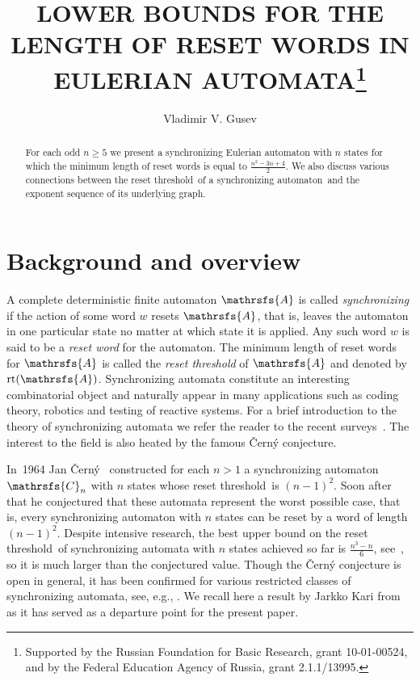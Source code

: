 \documentclass[12pt,twoside]{article}
\newcommand{\san}{synchronizing automaton}
\newcommand{\reth}{reset threshold}
\DeclareMathOperator{\rt}{rt}
\begin{document}
\title{LOWER BOUNDS FOR THE LENGTH OF RESET WORDS IN EULERIAN AUTOMATA\thanks{Supported
by the Russian Foundation for Basic Research, grant 10-01-00524, and by the
Federal Education Agency of Russia, grant 2.1.1/13995.}}
\author{Vladimir V. Gusev}

\maketitle

\begin{abstract}
For each odd $n\ge 5$ we present a synchronizing Eulerian automaton with $n$
states for which the minimum length of reset words is equal to $\frac{n^2 - 3n
+ 4}{2}$. We also discuss various connections between the \reth\ of a \san\ and
the exponent sequence of its underlying graph.
\end{abstract}

\thispagestyle{empty}

\section{Background and overview}
\label{intro}


A complete deterministic finite automaton $\mathrsfs{A}$ is called
\emph{synchronizing} if the action of some word $w$ resets $\mathrsfs{A}$, that
is, leaves the automaton in one particular state no matter at which state it is
applied. Any such word $w$ is said to be a \emph{reset word} for the automaton.
The minimum length of reset words for $\mathrsfs{A}$ is called the \emph{\reth}
of $\mathrsfs{A}$ and denoted by $\rt(\mathrsfs{A})$. Synchronizing automata
constitute an interesting combinatorial object and naturally appear in many
applications such as coding theory, robotics and testing of reactive systems.
For a brief introduction to the theory of synchronizing automata we refer the
reader to the recent surveys~\cite{Sa05,Vo08}. The interest to the field is
also heated by the famous \v{C}ern\'{y} conjecture.

In~1964 Jan \v{C}ern\'{y}~\cite{Ce64} constructed for each $n>1$ a
synchronizing automaton $\mathrsfs{C}_n$ with $n$ states whose \reth\ is
$(n-1)^2$. Soon after that he conjectured that these automata represent the
worst possible case, that is, every synchronizing automaton with $n$ states can
be reset by a word of length $(n-1)^2$. Despite intensive research, the best
upper bound on the \reth\ of synchronizing automata with $n$ states achieved so
far is $\frac{n^3-n}6$, see~\cite{Pi83}, so it is much larger than the
conjectured value. Though the \v{C}ern\'{y} conjecture is open in general, it
has been confirmed for various restricted classes of synchronizing automata,
see, e.g., \cite{Ep90,Du98,Ka03,Tr07,Vo09}. We recall here a result by Jarkko
Kari from~\cite{Ka03} as it has served as a departure point for the present
paper.
\end{document}
